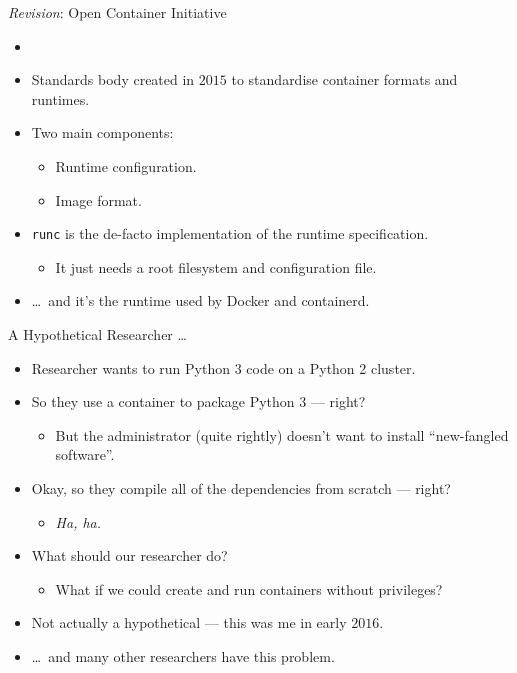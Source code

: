 \documentclass[10pt,aspectratio=169]{beamer}
\begin{document}
	\begin{frame}{\textit{Revision}: Open Container Initiative}
		\begin{itemize}
		    \item {} \only<2->{No.}
			\item<3-> Standards body created in $2015$ to standardise container formats and runtimes.
			\item<3-> Two main components:
			\begin{itemize}
				\item<3-> Runtime configuration.
				\item<3-> Image format.
			\end{itemize}
			\item<3-> \texttt{runc} is the de-facto implementation of the runtime specification.
			\begin{itemize}
				\item<3-> It just needs a root filesystem and configuration file.
			\end{itemize}
			\item<3-> \dots~and it's the runtime used by Docker and containerd.
		\end{itemize}
	\end{frame}

	\begin{frame}{A Hypothetical Researcher \dots}
		\begin{itemize}
			\item Researcher wants to run Python 3 code on a Python 2 cluster.
			\item<2-> So they use a container to package Python 3 --- right?
			\begin{itemize}
				\item<2-> But the administrator (quite rightly) doesn't want to install ``new-fangled software''.
			\end{itemize}
			\item<3-> Okay, so they compile all of the dependencies from scratch --- right?
			\begin{itemize}
				\item<3-> \textit{Ha, ha.}
			\end{itemize}
			\item<4-> What should our researcher do?
			\begin{itemize}
				\item<4-> What if we could create and run containers without privileges?
			\end{itemize}
			\item<5-> Not actually a hypothetical --- this was me in early $2016$.
			\item<5-> \dots~and many other researchers have this problem.
		\end{itemize}
	\end{frame}
\end{document}
